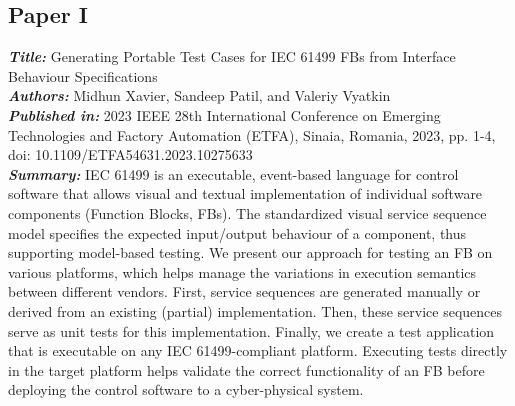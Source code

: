 \subsection{Paper I}
\textbf{\textit{Title:}} Generating Portable Test Cases for IEC 61499 FBs from Interface Behaviour Specifications\\
\textbf{\textit{Authors:}} Midhun Xavier, Sandeep Patil, and Valeriy Vyatkin\\
\textbf{\textit{Published in:}} 2023 IEEE 28th International Conference on Emerging Technologies and Factory Automation (ETFA), Sinaia, Romania, 2023, pp. 1-4,\\ doi: 10.1109/ETFA54631.2023.10275633\\
\textbf{\textit{Summary:}} IEC 61499 is an executable, event-based language for control software that allows visual and textual implementation of individual software components (Function Blocks, FBs). The standardized visual service sequence model specifies the expected input/output behaviour of a component, thus supporting model-based testing. We present our approach for testing an FB on various platforms, which helps manage the variations in execution semantics between different vendors. First, service sequences are generated manually or derived from an existing (partial) implementation. Then, these service sequences serve as unit tests for this implementation. Finally, we create a test application that is executable on any IEC 61499-compliant platform. Executing tests directly in the target platform helps validate the correct functionality of an FB before deploying the control software to a cyber-physical system.\\


